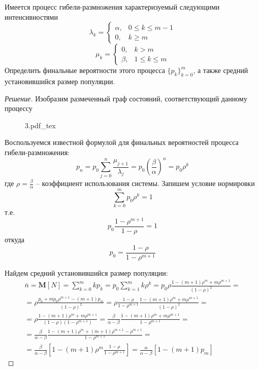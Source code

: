 \documentclass[12pt,a4paper]{article}
\author{Самутичев Е.Р.}
\date{\today}
\title{}
\newcommand{\incfig}[1]{%
	\def\svgwidth{\columnwidth}
	{#1.pdf_tex}
}
\newcommand{\mean}[1]{\mathbf{M}[#1]}
\begin{document}
	
\maketitle

\begin{exercise}[Задача 7]
	Имеется процесс гибели-размножения характеризуемый следующими интенсивностями
	$$\lambda_k = \begin{cases}
		\alpha, &0 \leq k \leq m-1 \\
		0, &k \geq m
	\end{cases}$$
	$$\mu_k = \begin{cases}
		0, &k > m \\
		\beta, &1 \leq k \leq m
	\end{cases}$$
	Определить финальные вероятности этого процесса $\{p_k\}_{k=0}^{m}$, а также средний установившийся размер популяции.
\end{exercise}
\begin{proof}[Решение]
	Изобразим размеченный граф состояний, соответствующий данному процессу
	\begin{figure}[h!]
		\centering
		\incfig{3}
	\end{figure}

	Воспользуемся известной формулой для финальных вероятностей процесса гибели-размножения:
	$$p_n = p_0 \sum_{j=0}^{n}{\frac{\mu_{j+1}}{\lambda_j}} = p_0 \left(\frac{\beta}{\alpha}\right)^n = p_0 \rho^k$$
	где $\rho = \frac{\beta}{\alpha}$ -- коэффициент использования системы. Запишем условие нормировки
	$$\sum_{k=0}^{m}{p_0 \rho^k} = 1$$
	т.е. 
	$$p_0 \frac{1 - \rho^{m+1}}{1 - \rho} = 1$$
	откуда
	$$p_0 = \frac{1 - \rho}{1 - \rho^{m+1}}$$
	
	Найдем средний установившийся размер популяции:
	\begin{multline*}
		\bar{n} = \mean{N} = \sum_{k=0}^{m}{k p_k} = p_0 \sum_{k=1}^{m}{k \rho^k} = p_0 \rho \frac{1 - (m+1)\rho^m + m\rho^{m+1}}{(1-\rho)^2} = \\ = \rho \frac{p_0 + m p_0 \rho^{m+1} - (m+1)p_m}{(1-\rho)^2} = \rho \frac{1 - \rho}{1 - \rho^{m+1}} \frac{1 - (m+1)\rho^m + m\rho^{m+1}}{(1-\rho)^2} = \\ = \rho \frac{1 - (m+1)\rho^m + m\rho^{m+1}}{(1-\rho)(1 - \rho^{m+1})} = \frac{\beta}{\alpha - \beta} \frac{1 - (m+1)\rho^m + m\rho^{m+1}}{1 - \rho^{m+1}} = \\ = \frac{\beta}{\alpha - \beta} \frac{1 - (m+1)\rho^m + (m+1)\rho^{m+1} - \rho^{m+1}}{1 - \rho^{m+1}} = \\ = \frac{\beta}{\alpha - \beta} \left[1 - (m+1) \rho^m \frac{1 - \rho}{1-\rho^{m+1}}\right] = \frac{\alpha}{\alpha - \beta}\left[1 - (m+1)p_m\right]
	\end{multline*}
\end{proof}
	
\end{document}
